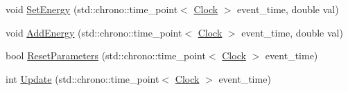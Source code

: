 \begin{DoxyCompactItemize}
\item 
void \mbox{\hyperlink{classCognitiveInput_a3498a8b5333606ef4d089e6c427ddf74}{Set\+Energy}} (std\+::chrono\+::time\+\_\+point$<$ \mbox{\hyperlink{universe_8h_a0ef8d951d1ca5ab3cfaf7ab4c7a6fd80}{Clock}} $>$ event\+\_\+time, double val)
\item 
void \mbox{\hyperlink{classCognitiveInput_a23f56d012233f655e1530ab61d80c27f}{Add\+Energy}} (std\+::chrono\+::time\+\_\+point$<$ \mbox{\hyperlink{universe_8h_a0ef8d951d1ca5ab3cfaf7ab4c7a6fd80}{Clock}} $>$ event\+\_\+time, double val)
\item 
bool \mbox{\hyperlink{classCognitiveInput_a943605b820cc279533e19d24e11405c6}{Reset\+Parameters}} (std\+::chrono\+::time\+\_\+point$<$ \mbox{\hyperlink{universe_8h_a0ef8d951d1ca5ab3cfaf7ab4c7a6fd80}{Clock}} $>$ event\+\_\+time)
\item 
int \mbox{\hyperlink{classCognitiveInput_a93bd9d88194a545c9a85512edcbb6044}{Update}} (std\+::chrono\+::time\+\_\+point$<$ \mbox{\hyperlink{universe_8h_a0ef8d951d1ca5ab3cfaf7ab4c7a6fd80}{Clock}} $>$ event\+\_\+time)
\end{DoxyCompactItemize}
